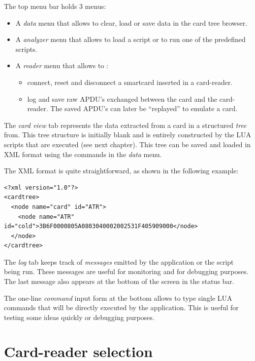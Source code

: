 \documentclass[11pt]{report}
\begin{document}
The top menu bar holds 3 menus:
\begin{itemize}
\item{A \emph{data} menu that allows to clear, load or save data in the card tree browser.}  
\item{A \emph{analyzer} menu that allows to load a script or to run one of the predefined scripts.}
\item{A \emph{reader} menu that allows to :
  \begin{itemize} 
  \item{connect, reset and disconnect a smartcard inserted in a card-reader.}
  \item{log and save raw APDU's exchanged between the card and the card-reader. The saved APDU's can later be ``replayed'' to emulate a card.}
  \end{itemize}}
\end{itemize}

The \emph{card view} tab represents the data extracted from a card in a structured \emph{tree} from.
This tree structure is initially blank and is entirely constructed by the LUA scripts that are executed (see next chapter).
This tree can be saved and loaded in XML format using the commands in the \emph{data} menu.

The XML format is quite straightforward, as shown in the following example:
\begin{verbatim}
<?xml version="1.0"?>
<cardtree>
  <node name="card" id="ATR">
    <node name="ATR" id="cold">3B6F0000805A0803040002002531F405909000</node>
  </node>
</cardtree>
\end{verbatim}

The \emph{log} tab keeps track of \emph{messages} emitted by the application or the script being run.
These messages are useful for monitoring and for debugging purposes. 
The last message also appears at the bottom of the screen in the status bar.

The one-line \emph{command} input form at the bottom allows to type single LUA commands that will be directly executed by the application.
This is useful for testing some ideas quickly or debugging purposes.

\section{Card-reader selection}
\end{document}
